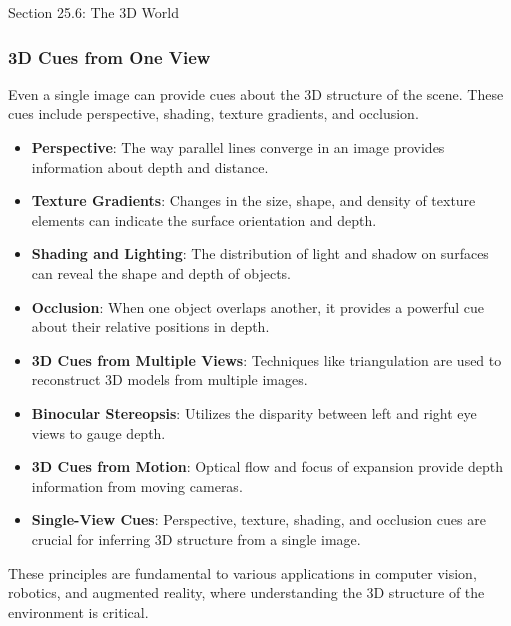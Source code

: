 \begin{notes}{Section 25.6: The 3D World}
\begin{highlight}
    \end{highlight}
    
    \subsubsection*{3D Cues from One View}
    
    Even a single image can provide cues about the 3D structure of the scene. These cues include perspective, shading, texture gradients, and occlusion.
    
    \begin{highlight}
    
        \begin{itemize}
            \item \textbf{Perspective}: The way parallel lines converge in an image provides information about depth and distance.
            \item \textbf{Texture Gradients}: Changes in the size, shape, and density of texture elements can indicate the surface orientation and depth.
            \item \textbf{Shading and Lighting}: The distribution of light and shadow on surfaces can reveal the shape and depth of objects.
            \item \textbf{Occlusion}: When one object overlaps another, it provides a powerful cue about their relative positions in depth.
        \end{itemize}
    
    \end{highlight}
    
    \begin{highlight}
    
        \begin{itemize}
            \item \textbf{3D Cues from Multiple Views}: Techniques like triangulation are used to reconstruct 3D models from multiple images.
            \item \textbf{Binocular Stereopsis}: Utilizes the disparity between left and right eye views to gauge depth.
            \item \textbf{3D Cues from Motion}: Optical flow and focus of expansion provide depth information from moving cameras.
            \item \textbf{Single-View Cues}: Perspective, texture, shading, and occlusion cues are crucial for inferring 3D structure from a single image.
        \end{itemize}
    
        These principles are fundamental to various applications in computer vision, robotics, and augmented reality, where understanding the 3D structure of the environment is critical.
    
    \end{highlight}
\end{notes}


